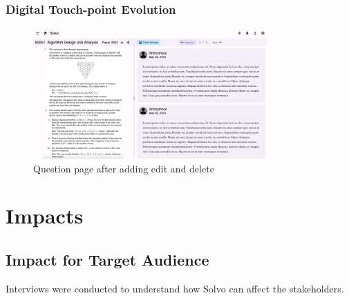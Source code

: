 \documentclass[a4paper]{article}
\begin{document}
    \subsubsection*{Digital Touch-point Evolution}

    \begin{figure}[H]
        \centering
        \includegraphics[width=0.8\textwidth]{question-page4}
        \\ Question page after adding edit and delete
    \end{figure}

    \section*{Impacts}

    \subsection*{Impact for Target Audience}

    \noindent Interviews were conducted to understand how Solvo can affect the stakeholders.
\end{document}

